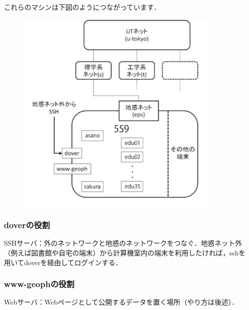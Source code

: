 \documentclass{jarticle}
\begin{document}
これらのマシンは下図のようにつながっています．
\begin{figure}[htbp]
 \begin{center}
  \includegraphics[width=10cm,pagebox=cropbox,clip]{fig/eps-net.png}
 \end{center}
 \label{fig:one}
\end{figure}

\subsubsection{doverの役割}
SSHサーバ：外のネットワークと地惑のネットワークをつなぐ．地惑ネット外（例えば図書館や自宅の端末）から計算機室内の端末を利用したければ，sshを用いてdoverを経由してログインする．

\subsubsection{www-geophの役割}
Webサーバ：Webページとして公開するデータを置く場所（やり方は後述）．
\end{document}
